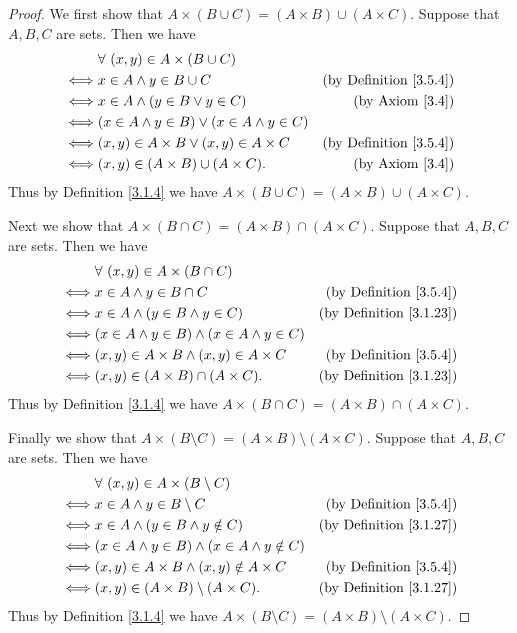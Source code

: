 \begin{proof}
We first show that \(A \times (B \cup C) = (A \times B) \cup (A \times C)\).
Suppose that \(A, B, C\) are sets.
Then we have
\begin{align*}
& \forall\ (x, y) \in A \times (B \cup C) \\
\iff & x \in A \land y \in B \cup C & \text{(by Definition \ref{3.5.4})} \\
\iff & x \in A \land (y \in B \lor y \in C) & \text{(by Axiom \ref{3.4})} \\
\iff & (x \in A \land y \in B) \lor (x \in A \land y \in C) \\
\iff & (x, y) \in A \times B \lor (x, y) \in A \times C & \text{(by Definition \ref{3.5.4})} \\
\iff & (x, y) \in (A \times B) \cup (A \times C). & \text{(by Axiom \ref{3.4})}
\end{align*}
Thus by Definition \ref{3.1.4} we have \(A \times (B \cup C) = (A \times B) \cup (A \times C)\).

Next we show that \(A \times (B \cap C) = (A \times B) \cap (A \times C)\).
Suppose that \(A, B, C\) are sets.
Then we have
\begin{align*}
& \forall\ (x, y) \in A \times (B \cap C) \\
\iff & x \in A \land y \in B \cap C & \text{(by Definition \ref{3.5.4})} \\
\iff & x \in A \land (y \in B \land y \in C) & \text{(by Definition \ref{3.1.23})} \\
\iff & (x \in A \land y \in B) \land (x \in A \land y \in C) \\
\iff & (x, y) \in A \times B \land (x, y) \in A \times C & \text{(by Definition \ref{3.5.4})} \\
\iff & (x, y) \in (A \times B) \cap (A \times C). & \text{(by Definition \ref{3.1.23})}
\end{align*}
Thus by Definition \ref{3.1.4} we have \(A \times (B \cap C) = (A \times B) \cap (A \times C)\).

Finally we show that \(A \times (B \setminus C) = (A \times B) \setminus (A \times C)\).
Suppose that \(A, B, C\) are sets.
Then we have
\begin{align*}
& \forall\ (x, y) \in A \times (B \setminus C) \\
\iff & x \in A \land y \in B \setminus C & \text{(by Definition \ref{3.5.4})} \\
\iff & x \in A \land (y \in B \land y \notin C) & \text{(by Definition \ref{3.1.27})} \\
\iff & (x \in A \land y \in B) \land (x \in A \land y \notin C) \\
\iff & (x, y) \in A \times B \land (x, y) \notin A \times C & \text{(by Definition \ref{3.5.4})} \\
\iff & (x, y) \in (A \times B) \setminus (A \times C). & \text{(by Definition \ref{3.1.27})}
\end{align*}
Thus by Definition \ref{3.1.4} we have \(A \times (B \setminus C) = (A \times B) \setminus (A \times C)\).
\end{proof}


